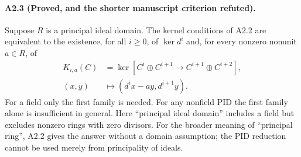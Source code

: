 \paragraph{A2.3 (Proved, and the shorter manuscript criterion refuted).}
\label{A2.3}
Suppose $R$ is a principal ideal domain.  The kernel conditions of A2.2
are equivalent to the existence, for all $i\geq0$, of $\ker d^i$ and,
for every nonzero nonunit $a\in R$, of
\begin{align*}
 K_{i,a}(C)&=\ker\left[
 C^i\oplus C^{i+1}\longrightarrow C^{i+1}\oplus C^{i+2}\right],\\
 (x,y)&\longmapsto(d^ix-ay,d^{i+1}y).
\end{align*}
For a field only the first family is needed.  For any nonfield PID
the first family alone is insufficient in general.  Here ``principal
ideal domain'' includes a field but excludes nonzero rings with zero
divisors.  For the broader meaning of ``principal ring'', A2.2 gives
the answer without a domain assumption; the PID reduction cannot be
used merely from principality of ideals.

